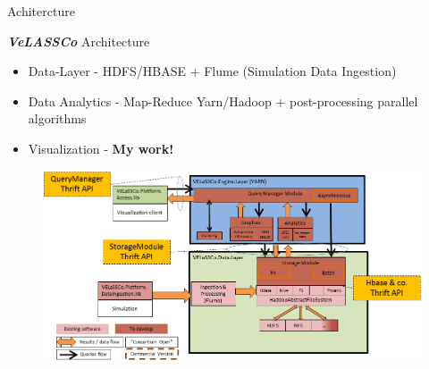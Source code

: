 \documentclass{beamer}
\begin{document}
  \begin{frame}{Achitercture}
		\begin{exampleblock}{\textbf{\textit{ VeLASSCo}} Architecture}
	\begin{itemize}
	\item Data-Layer - HDFS/HBASE + Flume (Simulation Data Ingestion)
	\item Data Analytics - Map-Reduce Yarn/Hadoop + post-processing parallel algorithms 
	\item Visualization - \textbf{My work!} 
	\end{itemize}
		 \begin{figure}
			 \centering
			   \includegraphics[scale=0.3]{velassco-platform-os}
		 \end{figure}

		\end{exampleblock}	
		
		

\end{frame} %
\end{document}
